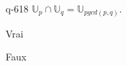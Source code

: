 \begin{truefalse}{q-618}
$\mathbb U_p \cap  \mathbb U_q=\mathbb U_{pgcd(p,q)}$.
\item* Vrai
\item Faux
\end{truefalse}

